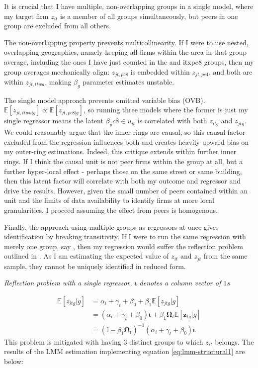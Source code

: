 It is crucial that I have multiple, non-overlapping groups in a single model,
where my target firm $z_{it}$ is a member of all groups simultaneously,
but peers in one group are excluded from all others.
\par
The non-overlapping property prevents multicollinearity.
If I were to use nested, overlapping geographies,
namely keeping all firms within the  area in that group average,
including the ones I have just counted in the  and itx{pc8} groups,
then my group averages mechanically align:
$z_{jt,pc8}$ is embedded within $z_{jt,pc4}$, and both are within $z_{jt,ttwa}$,
making $\beta_g$ parameter estimates unstable.
\par
The single model approach prevents omitted variable bias (OVB).
$\mathbb E[z_{jt,ttwa|g}] \propto  \mathbb E[z_{jt,pc8|g}]$,
so running three models where the former is just my single regressor means
the latent $\beta_pc8 \in u_{it}$ is correlated with both $z_{itg}$ and $z_{jtg}$.
We could reasonably argue that the inner rings are causal,
so this causal factor excluded from the regression influences both
and creates heavily upward bias on my outer-ring estimations.
Indeed, this critique extends within further inner rings.
If I think the causal unit is not peer firms within the  group at all,
but a further hyper-local effect - perhaps those on the same street or same building,
then this latent factor will correlate with both my outcome and regressor and drive the results.
However, given the small number of peers contained within an  unit and
the limits of data availability to identify firms at more local granularities,
I proceed assuming the effect from  peers is homogenous.
\par
Finally, the approach using multiple groups as regressors at once gives identification
by breaking transitivity.
If I were to run the same regression with merely one group, say ,
then my regression would suffer the reflection  problem outlined in \citep{Manski1993}.
As I am estimating the expected value of $z_{it}$ and $z_{jt}$ from the same sample,
they cannot be uniquely identified in reduced form.

\noindent
\textit{Reflection problem with a single regressor, $\boldsymbol\iota$ denotes a column vector of $1$s}

\begin{align*}
    \mathbb E[z_{itg}|g] &= \alpha_i + \gamma_t + \beta_0 + \beta_1 \mathbb{E}[z_{jtg}|g]
    \\
    &= (\alpha_i + \gamma_t + \beta_0)\boldsymbol\iota + \beta_1 \mathbf\Omega_t \mathbb E[\mathbf{z}_{tg}|g]
    \\
    &= (\mathbb I - \beta_1 \mathbf\Omega_t)^{-1} (\alpha_i + \gamma_t + \beta_0)\boldsymbol\iota
\end{align*}
%
This problem is mitigated with having 3 distinct groups to which $z_{it}$ belongs.
The results of the LMM estimation implementing equation \ref{eq:lmm-structural1} are below:


